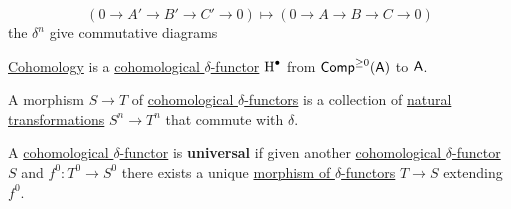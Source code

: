 \documentclass[../../../main]{subfiles}
\begin{document}
\begin{definition}
\begin{enumerate}
          \begin{equation*}
            \left( 0 \to A' \to B' \to C' \to 0 \right) \mapsto \left( 0 \to A \to B \to C \to 0 \right)
          \end{equation*}
          the \(\delta^{n}\) give commutative diagrams
          \begin{center}
          \end{center}
  \end{enumerate}
\end{definition}

\begin{example}
  \hyperref[def:cohomology]{Cohomology} is a \hyperref[def:delta-functor]{cohomological \(\delta\)-functor} \(\cohomology{\bullet}\) from \(\Complex[\geq 0]{\category{A}}\) to \(\category{A}\).
\end{example}

\begin{definition} \label{def:morphism-delta-functor}
  A morphism \(S \to T\) of \hyperref[def:delta-functor]{cohomological \(\delta\)-functors} is a collection of \hyperref[def:natural-transformation]{natural transformations} \(S^{n} \to T^{n}\) that commute with \(\delta\).
\end{definition}

\begin{definition} \label{def:universal-delta-functor}
  A \hyperref[def:delta-functor]{cohomological \(\delta\)-functor} is \textbf{universal} if given another \hyperref[def:delta-functor]{cohomological \(\delta\)-functor} \(S\) and \(f^{0}: T^{0} \to S^{0}\) there exists a unique \hyperref[def:morphism-delta-functor]{morphism of \(\delta\)-functors} \(T \to S\) extending \(f^{0}\).
\end{definition}
\end{document}
